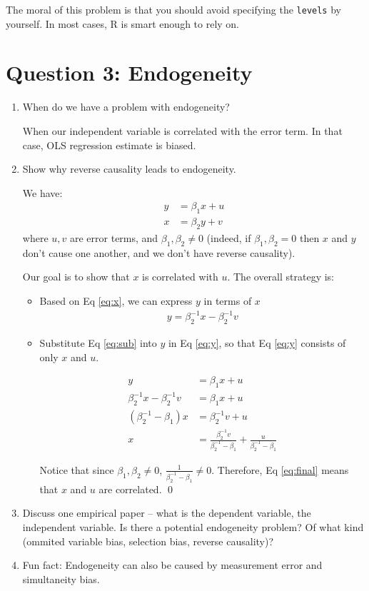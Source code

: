 \documentclass{article}\usepackage[]{graphicx}\usepackage[]{color}
\begin{document}
The moral of this problem is that you should avoid specifying the \verb`levels` by yourself. In most cases, R is smart enough to rely on.

\section{Question 3: Endogeneity}
\begin{enumerate}
\item When do we have a problem with endogeneity?

When our independent variable is correlated with the error term. In that case, OLS regression estimate is biased.

\item Show why reverse causality leads to endogeneity.

We have:
\begin{align}
y &= \beta_1 x + u \label{eq:y} \\
x &= \beta_2 y + v \label{eq:x}
\end{align}
where $u, v$ are error terms, and $\beta_1, \beta_2 \neq 0$ (indeed, if $\beta_1, \beta_2 = 0$ then $x$ and $y$ don't cause one another, and we don't have reverse causality).

Our goal is to show that $x$ is correlated with $u$. The overall strategy is:
\begin{itemize}
  \item Based on Eq \ref{eq:x}, we can express $y$ in terms of $x$
  \begin{align}
  y = \beta_2^{-1}x - \beta_2^{-1}v \label{eq:sub}
  \end{align}

  \item Substitute Eq \ref{eq:sub} into $y$ in Eq \ref{eq:y}, so that Eq \ref{eq:y} consists of only $x$ and $u$.

  \begin{align}
  y &= \beta_1 x + u \\
  \beta_2^{-1}x - \beta_2^{-1}v &= \beta_1 x + u \\
  (\beta_2^{-1} - \beta_1)x &= \beta_2^{-1}v + u \\
  x &= \frac{\beta_2^{-1}v}{\beta_2^{-1} - \beta_1} + \frac{u}{\beta_2^{-1} - \beta_1} \label{eq:final}
  \end{align}

  Notice that since $\beta_1, \beta_2 \neq 0$, $\frac{1}{\beta_2^{-1} - \beta_1} \neq 0$. Therefore, Eq \ref{eq:final} means that $x$ and $u$ are correlated. \qed
\end{itemize}

\item Discuss one empirical paper -- what is the dependent variable, the independent variable. Is there a potential endogeneity problem? Of what kind (ommited variable bias, selection bias, reverse causality)?
\item Fun fact: Endogeneity can also be caused by measurement error and simultaneity bias.
\end{enumerate}
\end{document}
